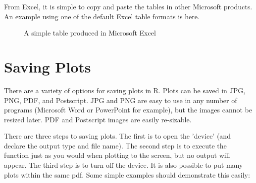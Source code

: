 \documentclass[a4paper,11pt]{article}\usepackage[]{graphicx}\usepackage[]{color}
\begin{document}
From Excel, it is simple to copy and paste the tables in other Microsoft products. An example using one of the default Excel table formats is here.

\begin{figure}[ht!]
\centering
\caption{A simple table produced in Microsoft Excel}
\label{overflow}
\end{figure}

\section{Saving Plots}
\label{app:savingPlots}
There are a variety of options for saving plots in R. Plots can be saved in JPG, PNG, PDF, and Postscript. JPG and PNG are easy to use in any number of programs (Microsoft Word or PowerPoint for example), but the images cannot be resized later. PDF and Postscript images are easily re-sizable.

There are three steps to saving plots. The first is to open the 'device' (and declare the output type and file name). The second step is to execute the function just as you would when plotting to the screen, but no output will appear. The third step is to turn off the device. It is also possible to put many plots within the same pdf.  Some simple examples should demonstrate this easily:
\end{document}
